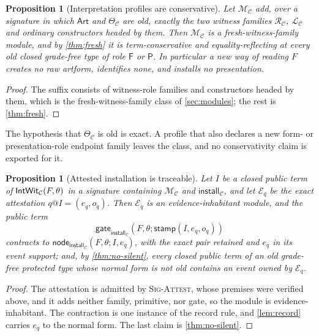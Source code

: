 \documentclass[11pt]{article}
\numberwithin{equation}{section}
\theoremstyle{definition}
\theoremstyle{plain}
\newtheorem{proposition}[definition]{Proposition}
\theoremstyle{remark}
\newcommand{\Frm}{\mathsf F}
\newcommand{\Prs}{\mathsf P}
\begin{document}
\begin{proposition}[Interpretation profiles are conservative]
\label{prop:profile-conservative}
Let \(\mathcal M_{\mathcal C}\) add, over a signature in which
\(\mathsf{Art}\) and \(\Theta_{\mathcal C}\) are old, exactly the two
witness families \(\mathcal R_{\mathcal C}\), \(\mathcal L_{\mathcal C}\)
and ordinary constructors headed by them.  Then \(\mathcal M_{\mathcal C}\)
is a fresh-witness-family module, and by \cref{thm:fresh} it is
term-conservative and equality-reflecting at every old closed grade-free
type of role \(\Frm\) or \(\Prs\).  In particular a new way of reading
\(F\) creates no raw artform, identifies none, and installs no presentation.
\end{proposition}

\begin{proof}
The suffix consists of witness-role families and constructors headed by
them, which is the fresh-witness-family class of \cref{sec:modules}; the
rest is \cref{thm:fresh}.
\end{proof}

The hypothesis that \(\Theta_{\mathcal C}\) is old is exact.  A profile that
also declares a new form- or presentation-role endpoint family leaves the
class, and no conservativity claim is exported for it.

\begin{proposition}[Attested installation is traceable]
\label{prop:attested-installation}
Let \(I\) be a closed public term of
\({\mathsf{IntWit}}_{\mathcal C}(F,\theta)\) in a signature containing
\(\mathcal M_{\mathcal C}\) and \(\mathsf{install}_{\mathcal C}\), and let
\(\mathcal E_q\) be the exact attestation \(q@I=(e_q,o_q)\).
Then \(\mathcal E_q\) is an evidence-inhabitant module, and the public term
\[
 \mathsf{gate}_{\mathsf{install}_{\mathcal C}}
 (F,\theta;\mathsf{stamp}(I,e_q,o_q))
\]
contracts to
\(\mathsf{node}_{\mathsf{install}_{\mathcal C}}(F,\theta;I,e_q)\), with the
exact pair retained and \(e_q\) in its event support; and, by
\cref{thm:no-silent}, every closed public term of an old grade-free
protected type whose normal form is not old contains an event owned by
\(\mathcal E_q\).
\end{proposition}

\begin{proof}
The attestation is admitted by \textsc{Sig-Attest}, whose premises were
verified above, and it adds neither family, primitive, nor gate, so the
module is evidence-inhabitant.  The contraction is one instance of the
record rule, and \cref{lem:record} carries \(e_q\) to the normal form.
The last claim is \cref{thm:no-silent}.
\end{proof}
\end{document}
